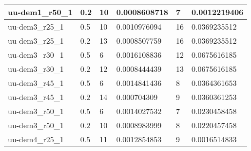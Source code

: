 \begin{table}[]
\begin{tabular}{|l|l|l|l|l|l|}
    uu-dem1\_r50\_1                                & 0.2                                         & 10                             & 0.0008608718                    & 7                              & 0.0012219406                    \\ \hline
    uu-dem3\_r25\_1                                & 0.5                                         & 10                             & 0.0010976094                    & 16                             & 0.0369235512                    \\ \hline
    uu-dem3\_r25\_1                                & 0.2                                         & 13                             & 0.0008507759                    & 16                             & 0.0369235512                    \\ \hline
    uu-dem3\_r30\_1                                & 0.5                                         & 6                              & 0.0016108836                    & 12                             & 0.0675616185                    \\ \hline
    uu-dem3\_r30\_1                                & 0.2                                         & 12                             & 0.0008444439                    & 13                             & 0.0675616185                    \\ \hline
    uu-dem3\_r45\_1                                & 0.5                                         & 6                              & 0.0014841436                    & 8                              & 0.0364361653                    \\ \hline
    uu-dem3\_r45\_1                                & 0.2                                         & 14                             & 0.000704309                     & 9                              & 0.0360361253                    \\ \hline
    uu-dem3\_r50\_1                                & 0.5                                         & 6                              & 0.0014027532                    & 7                              & 0.0230458458                    \\ \hline
    uu-dem3\_r50\_1                                & 0.2                                         & 10                             & 0.0008983999                    & 8                              & 0.0220457458                    \\ \hline
    uu-dem4\_r25\_1                                & 0.5                                         & 11                             & 0.0012854853                    & 9                              & 0.0016514833                    \\ \hline

\end{tabular}
\end{table}
